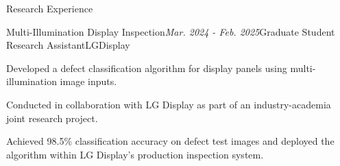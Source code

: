\begin{rSection}{Research Experience}

\begin{rSubsection}{Multi-Illumination Display Inspection}{\em Mar. 2024 - Feb. 2025}{Graduate Student Research Assistant}{LGDisplay}
  \item Developed a defect classification algorithm for display panels using multi-illumination image inputs.
  \item Conducted in collaboration with LG Display as part of an industry-academia joint research project.
  \item Achieved 98.5\% classification accuracy on defect test images and deployed the algorithm within LG Display’s production inspection system.
\end{rSubsection}

\end{rSection}

